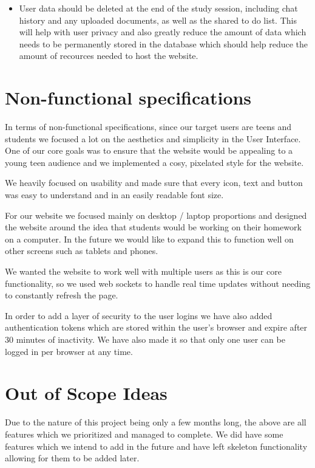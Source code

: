 \begin{itemize}
\item User data should be deleted at the end of the study session, including chat history and any uploaded documents, as well as the shared to do list. This will help with user privacy and also greatly reduce the amount of data which needs to be permanently stored in the database which should help reduce the amount of recources needed to host the website.
\end{itemize}


\section{Non-functional specifications}
\label{sect:non-functional-specifications}

In terms of non-functional specifications, since our target users are teens and students we focused a lot on the aesthetics and simplicity in the User Interface. One of our core goals was to ensure that the website would be appealing to a young teen audience and we implemented a cosy, pixelated style for the website.

We heavily focused on usability and made sure that every icon, text and button was easy to understand and in an easily readable font size.

For our website we focused mainly on desktop / laptop proportions and designed the website around the idea that students would be working on their homework on a computer. In the future we would like to expand this to function well on other screens such as tablets and phones.

We wanted the website to work well with multiple users as this is our core functionality, so we used web sockets to handle real time updates without needing to constantly refresh the page.

In order to add a layer of security to the user logins we have also added authentication tokens which are stored within the user's browser and expire after 30 minutes of inactivity. We have also made it so that only one user can be logged in per browser at any time.

\section{Out of Scope Ideas}
\label{sect:out-of-scope-ideas}

Due to the nature of this project being only a few months long, the above are all features which we prioritized and managed to complete. We did have some features which we intend to add in the future and have left skeleton functionality allowing for them to be added later.

